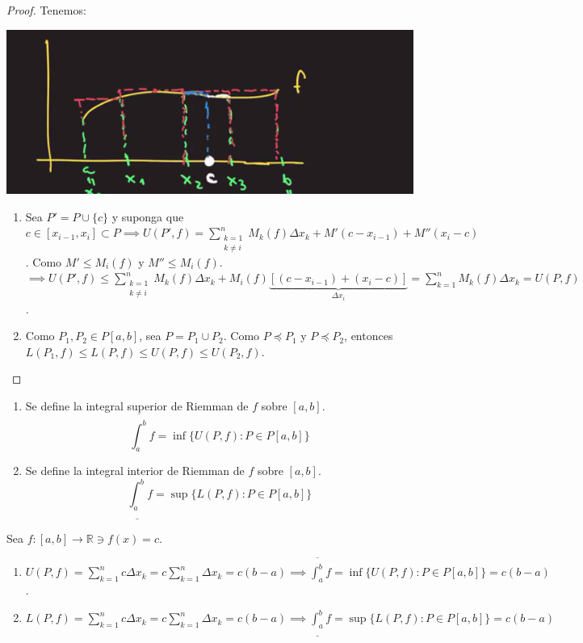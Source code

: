 \begin{proof}
	Tenemos: 
		\begin{center}
		\includegraphics[scale=0.5]{images/1/3}
	\end{center}
	\begin{enumerate}
		\item Sea $P'=P\cup \{c\}$ y suponga que $c\in [x_{i-1},x_i]\subset P\implies U(P',f)=\sum_{\substack{k=1\\ k\neq i}}^{n}M_k(f)\Delta x_k+M'(c-x_{i-1})+M''(x_i-c)$. Como $M'\leq M_i(f)$ y $M''\leq M_i(f)$. $\implies U(P',f)\leq \sum_{\substack{k=1\\k\neq i}}^{n}M_k(f)\Delta x_k + M_i(f)\underbrace{[(c-x_{i-1})+(x_i-c)]}_{\Delta x_i}=\sum_{k=1}^{n} M_k(f)\Delta x_k=U(P,f)$. 
		\item Como $P_1,P_2\in P[a,b]$, sea $P=P_1\cup P_2$. Como $P\preceq P_1$ y $P\preceq P_2$, entonces $L(P_1,f)\leq L(P,f)\leq U(P,f)\leq U(P_2,f)$.
	\end{enumerate}
\end{proof}

\begin{definicion}
	\begin{enumerate}
		\item Se define la integral superior de Riemman de $f$ sobre $[a,b]$. 
	$$\overline{\int_a^b}f=\inf\{U(P,f):P\in P[a,b]\}$$
		\item Se define la integral interior de Riemman de $f$ sobre $[a,b]$. 
	$$\underline{\int_a^b}f=\sup\{L(P,f):P\in P[a,b]\}$$
	\end{enumerate}
\end{definicion}
\begin{ejemplo}
	Sea $f:[a,b]\to \mathbb{R}\ni f(x)=c$.
	\begin{enumerate}
		\item $ U(P,f)=\sum_{k=1}^{n}c\Delta x_k=c\sum_{k=1}^{n}\Delta x_k=c(b-a)\implies \overline{\int_a^b}f=\inf \{U(P,f):P\in P[a,b]\}=c(b-a)$.
		\item $ L(P,f)=\sum_{k=1}^{n}c\Delta x_k=c\sum_{k=1}^{n}\Delta x_k=c(b-a)\implies \underline{\int_a^b}f=\sup \{L(P,f):P\in P[a,b]\}=c(b-a)$
	\end{enumerate}
\end{ejemplo}

